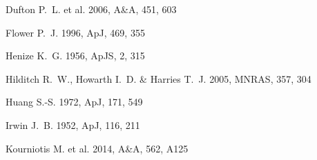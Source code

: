 \documentclass[useAMS,usenatbib]{mn2e}
\begin{document}
\begin{thebibliography}{}




 Dufton P.~L. et al. 2006, A\&A, 451, 603 


 Flower P.~J. 1996, ApJ, 469, 355 









 Henize 
K.~G. 1956, ApJS, 2, 315 


 Hilditch R.~W., Howarth I.~D. \& Harries T.~J. 2005, MNRAS, 357, 304 

 Huang S.-S. 1972, ApJ, 171, 549 


 Irwin J.~B. 1952, ApJ, 116, 211 




 Kourniotis M. et al. 2014, A\&A, 562, A125 




\end{thebibliography}
\end{document}
